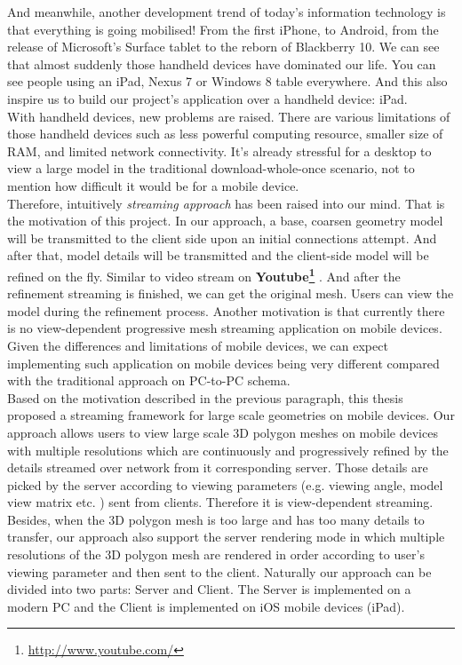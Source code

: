 And meanwhile, another development trend of today's information technology is that everything is going mobilised! From the first iPhone, to Android, from the release of Microsoft's Surface tablet to the reborn of Blackberry 10. We can see that almost suddenly those handheld devices have dominated our life. You can see people using an iPad, Nexus 7 or Windows 8 table everywhere. And this also inspire us to build our project's application over a handheld device: iPad. \\

With handheld devices, new problems are raised. There are various limitations of those handheld devices such as less powerful computing resource, smaller size of RAM, and limited network connectivity. It's already stressful for a desktop to view a large model in the traditional download-whole-once scenario, not to mention how difficult it would be for a mobile device. \\

Therefore, intuitively \emph{streaming approach} has been raised into our mind. That is the motivation of this project. In our approach, a base, coarsen geometry model will be transmitted to the client side upon an initial connections attempt. And after that, model details will be transmitted and the client-side model will be refined on the fly. Similar to video stream on \textbf{Youtube\footnote{\label{UTUBE}\url{http://www.youtube.com/}} }. And after the refinement streaming is finished, we can get the original mesh. Users can view the model during the refinement process. Another motivation is that currently there is no view-dependent progressive mesh streaming application on mobile devices. Given the differences and limitations of mobile devices, we can expect implementing such application on mobile devices being very different compared with the traditional approach on PC-to-PC schema.  \\

Based on the motivation described in the previous paragraph, this thesis proposed a streaming framework for large scale geometries on mobile devices. Our approach allows users to view large scale 3D polygon meshes on mobile devices with multiple resolutions which are continuously and progressively refined by the details streamed over network from it corresponding server. Those details are picked by the server according to viewing parameters (e.g. viewing angle, model view matrix etc. ) sent from clients. Therefore it is view-dependent streaming. Besides, when the 3D polygon mesh is too large and has too many details to transfer, our approach also support the server rendering mode in which multiple resolutions of the 3D polygon mesh are rendered in order according to user's viewing parameter and then sent to the client. Naturally our approach can be divided into two parts: Server and Client. The Server is implemented on a modern PC and the Client is implemented on iOS mobile devices (iPad).


